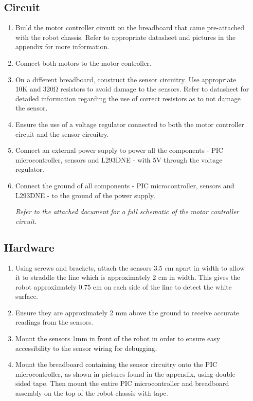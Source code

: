 \documentclass[12pt]{article}
\begin{document}
\subsection{Circuit}
\begin{enumerate}
	\item Build the motor controller circuit on the breadboard that came pre-attached with the robot chassis. Refer to appropriate datasheet and pictures in the appendix for more information.
	\item Connect both motors to the motor controller.
	\item On a different breadboard, construct the sensor circuitry. Use appropriate 10K and 320Ω resistors to avoid damage to the sensors. Refer to datasheet for detailed information regarding the use of correct resistors as to not damage the sensor.
	\item Ensure the use of a voltage regulator connected to both the motor controller circuit and the sensor circuitry.
	\item Connect an external power supply to power all the components - PIC microcontroller, sensors and L293DNE - with 5V through the voltage regulator.
	\item Connect the ground of all components - PIC microcontroller, sensors and L293DNE - to the ground of the power supply. 
	
	\textit{Refer to the attached document for a full schematic of the motor controller circuit.}
\end{enumerate}

\subsection{Hardware}
\begin{enumerate}
	\item Using screws and brackets, attach the sensors 3.5 cm apart in width to allow it to straddle the line which is approximately 2 cm in width. This gives the robot approximately 0.75 cm on each side of the line to detect the white surface.
	\item Ensure they are approximately 2 mm above the ground to receive accurate readings from the sensors.
	\item Mount the sensors 1mm in front of the robot in order to ensure easy accessibility to the sensor wiring for debugging.
	\item Mount the breadboard containing the sensor circuitry onto the PIC microcontroller, as shown in pictures found in the appendix, using double sided tape. Then mount the entire PIC microcontroller and breadboard assembly on the top of the robot chassis with tape.
\end{enumerate}
\newpage
\end{document}
